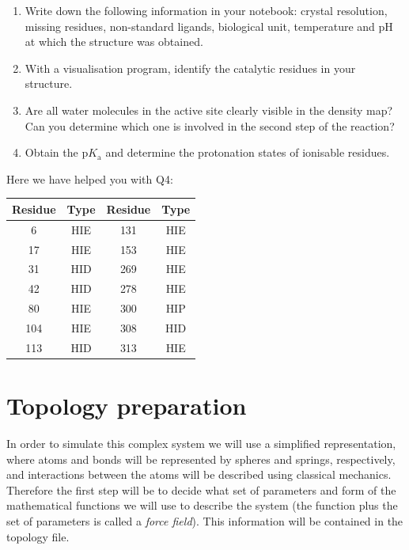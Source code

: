 \documentclass[10pt]{article}
\begin{document}
\begin{question}
    \begin{enumerate}[leftmargin=0.6cm]
        \renewcommand{\labelenumi}{Q\arabic{enumi}.}
        \item Write down the following information in your notebook: crystal resolution, missing residues, non-standard ligands, biological unit, temperature and pH at which the structure was obtained.
        \item With a visualisation program, identify the catalytic residues in your structure.
        \item Are all water molecules in the active site clearly visible in the density map? Can you determine which one is involved in the second step of the reaction?
        \item Obtain the \(\mathrm pK_\mathrm{a}\) and determine the protonation states of ionisable residues. 
    \end{enumerate}
\end{question}

Here we have helped you with Q4:

\begin{center}
    \begin{tabular}{cc|cc}
        \toprule
        Residue & Type & Residue & Type \\
        \midrule
        6       & HIE  & 131     & HIE  \\
        17      & HIE  & 153     & HIE  \\
        31      & HID  & 269     & HIE  \\
        42      & HID  & 278     & HIE  \\
        80      & HIE  & 300     & HIP  \\
        104     & HIE  & 308     & HID  \\
        113     & HID  & 313     & HIE  \\
        \bottomrule
    \end{tabular}
\end{center}


\section{Topology preparation}

In order to simulate this complex system we will use a simplified representation, where atoms and bonds will be represented by spheres and springs, respectively, and interactions between the atoms will be described using classical mechanics. Therefore the first step will be to decide what set of parameters and form of the mathematical functions we will use to describe the system (the function plus the set of parameters is called a \textit{force field}). This information will be contained in the topology file. 
\end{document}
